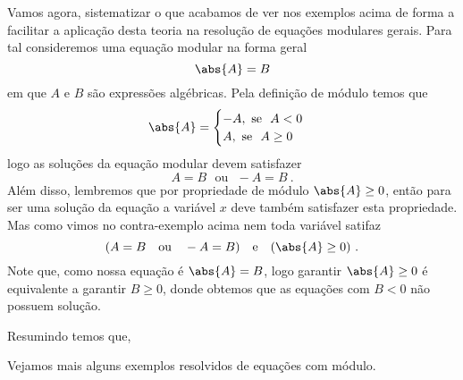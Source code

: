  Vamos agora, sistematizar o que acabamos de ver nos exemplos acima de forma a facilitar a aplicação desta teoria na resolução de equações modulares gerais. Para tal consideremos uma equação modular na forma geral
\begin{equation}
\abs{A}= B
\end{equation}
 em que $A$ e $B$ são expressões algébricas. Pela definição de módulo temos que
 \[ \abs{A}= \begin{cases}
          -A, \ \text{se} \ \ A < 0 \\
           A, \ \text{se} \ \ A \geq 0
         \end{cases}
 \]
 logo as soluções da equação modular devem satisfazer
\begin{equation}
A= B \ \ \ \text{ou} \ \ \ -A= B \ .
\end{equation}
 Além disso, lembremos que por propriedade de módulo $\abs{A}\geq 0$, então para ser uma solução da equação a variável $x$ deve também satisfazer esta propriedade. Mas como vimos no contra-exemplo acima nem toda variável satifaz
\begin{equation}
(A= B \ \ \ \text{ou} \ \ \ -A= B) \ \ \ \text{e} \ \ \ (\abs{A}\geq 0) \ . 
\end{equation}
 Note que, como nossa equação é $\abs{A}= B$, logo garantir $\abs{A}\geq 0$ é equivalente a garantir $B \geq 0$, donde obtemos que as equações com $B < 0$ não possuem solução.

 Resumindo temos que,

  \vskip0.3cm
 \vskip0.3cm

 Vejamos mais alguns exemplos resolvidos de equações com módulo.

